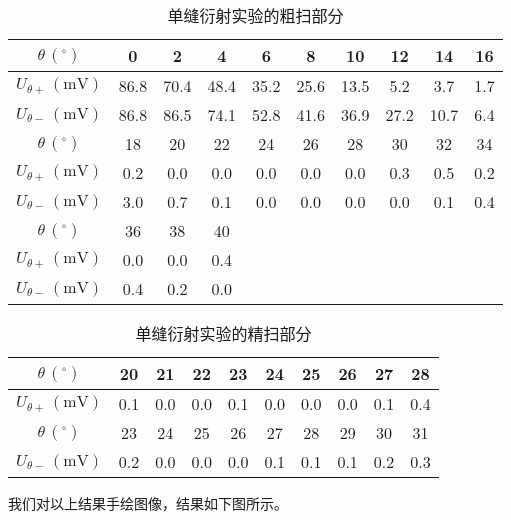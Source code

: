 \documentclass[12pt]{article}
\begin{document}
\begin{table}[h!]
    \centering
    \begin{tabular}{|c|c|c|c|c|c|c|c|c|c|}
    \hline
    $\theta\,(^\circ)$            & 0     & 2     & 4     & 6    & 8    & 10   & 12   & 14   & 16   \\ \hline
    $U_{\theta +}\,(\mathrm{mV})$ & 86.8 & 70.4 & 48.4  & 35.2 & 25.6  & 13.5  & 5.2  & 3.7 & 1.7 \\ \hline
    $U_{\theta -}\,(\mathrm{mV})$ & 86.8 & 86.5 & 74.1 & 52.8 & 41.6 & 36.9  & 27.2  & 10.7 & 6.4 \\ \hline
    $\theta\,(^\circ)$            & 18    & 20    & 22    & 24   & 26   & 28   & 30   & 32   & 34   \\ \hline
    $U_{\theta +}\,(\mathrm{mV})$ & 0.2  & 0.0  & 0.0 & 0.0 & 0.0 & 0.0 & 0.3  & 0.5  & 0.2  \\ \hline
    $U_{\theta -}\,(\mathrm{mV})$ & 3.0  & 0.7 & 0.1 & 0.0 & 0.0 & 0.0 & 0.0  & 0.1  & 0.4  \\ \hline
    $\theta\,(^\circ)$            & 36    & 38    & 40    &      &      &      &      &      &      \\ \hline
    $U_{\theta +}\,(\mathrm{mV})$ & 0.0   & 0.0  & 0.4  &   &   &   &   &   &      \\ \hline
    $U_{\theta -}\,(\mathrm{mV})$ & 0.4   & 0.2  & 0.0  &   &   &   &   &   &      \\ \hline
    \end{tabular}
    \caption{单缝衍射实验的粗扫部分}
\end{table}

\begin{table}[h!]
    \centering
    \begin{tabular}{|c|c|c|c|c|c|c|c|c|c|}
    \hline
    $\theta\,(^\circ)$            & 20     & 21     & 22     & 23    & 24    & 25   & 26   & 27   & 28   \\ \hline
    $U_{\theta +}\,(\mathrm{mV})$ & 0.1 & 0.0 & 0.0 & 0.1 & 0.0 & 0.0 & 0.0 & 0.1 & 0.4 \\ \hline
    $\theta\,(^\circ)$            & 23     & 24     & 25     & 26    & 27    & 28   & 29   & 30   & 31   \\ \hline
    $U_{\theta -}\,(\mathrm{mV})$ & 0.2 & 0.0 & 0.0 & 0.0 & 0.1 & 0.1 & 0.1 & 0.2 & 0.3 \\ \hline
    \end{tabular}
    \caption{单缝衍射实验的精扫部分}
\end{table}

我们对以上结果手绘图像，结果如下图所示。
\end{document}
